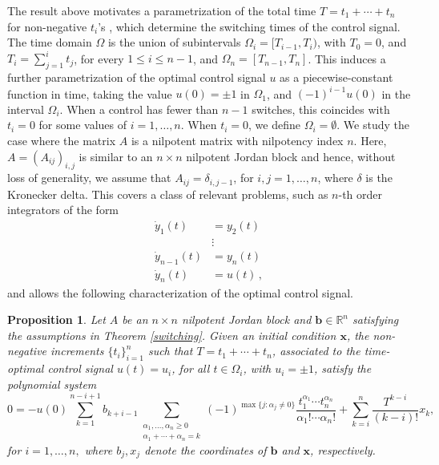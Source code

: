 \documentclass[11pt]{amsart}
\newcommand{\R}{\mathbb{R}}
\newtheorem{proposition}[theorem]{Proposition}
\theoremstyle{definition}
\theoremstyle{remark}
\numberwithin{equation}{section}
\begin{document}
The result above motivates a parametrization of the total time $T=t_1+\cdots+t_n$ for non-negative $t_i$'s%
, which determine the switching times of the control signal. 
 The time domain $\Omega$ is the union of subintervals $\Omega_i=[T_{i-1},T_i)$, with $T_0=0$, and $T_i=\sum_{j=1}^i t_j$, for every $1\leq i\leq n-1$, and $\Omega_n=[T_{n-1},T_n]$. This induces a further parametrization of the optimal control signal $u$ as a piecewise-constant function in time, taking the value $u(0)=\pm 1$ in $\Omega_1$, and $(-1)^{i-1}u(0)$ in the interval $\Omega_i$. When a control has fewer than $n-1$ switches, this coincides with $t_i=0$ for some values of $i=1,\ldots,n$. When $t_i=0$, we define $\Omega_i=\emptyset$. We study the case where the matrix $A$ is a nilpotent matrix with nilpotency index $n$. Here, $A=(A_{ij})_{i,j}$ is similar to an $n\times n$ nilpotent Jordan block and hence, without loss of generality, we assume that $A_{ij}=\delta_{i,j-1}$, for $i,j=1, \dots, n$, where $\delta$ is the Kronecker delta. This covers a class of relevant problems, such as $n$-th order integrators of the form
\begin{align*}
\dot y_1(t)&=y_2(t)\\
&\vdots\\
\dot y_{n-1}(t)&=y_n(t)\\
\dot y_n(t)&=u(t)\,,
\end{align*}
and allows the following characterization of the optimal control signal.
\begin{proposition}\label{prop:21}
 Let $A$ be an $n\times n$ nilpotent Jordan block and $\bm{b}\in\R^n$ satisfying the assumptions in Theorem \ref{switching}. Given an initial condition $\bm{x}$, the non-negative increments $\{t_i\}_{i=1}^n$ such that $T=t_1+\cdots+t_n$, associated to the time-optimal control signal $u(t)=u_i$, for all $t \in \Omega_i$, with $u_i=\pm 1$, satisfy the polynomial system
 \begin{equation}\label{eq:polynomialSystem2}
 0=-u(0){\sum_{k=1}^{n-i+1} b_{k+i-1}}\sum_{\substack{\alpha_1,\ldots,\alpha_n\geq0\\
 \alpha_1+\cdots+\alpha_n=k}}(-1)^{\max \{j\colon \alpha_j\neq0\}}\frac{t_1^{\alpha_1}\cdots t_n^{\alpha_n}}{\alpha_1!\cdots\alpha_n!}+{\sum_{k=i}^{n}\frac{T^{k-i}}{(k-i)!}x_{k}},
 \end{equation}
 for $i=1,\dots,n,$ where $b_j, x_j$ denote the coordinates of $\bm b$ and $\bm x$, respectively.
 \end{proposition} 
\end{document}
